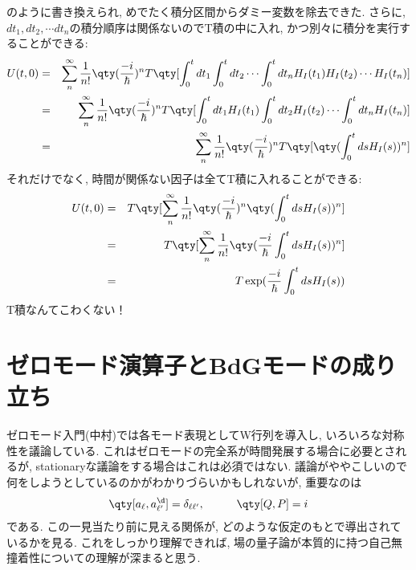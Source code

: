 \documentclass[10.5pt,a4paper]{jreport}
\begin{document}
のように書き換えられ, めでたく積分区間からダミー変数を除去できた. さらに, $dt_1, dt_2, \cdots dt_n$の積分順序は関係ないのでT積の中に入れ, かつ別々に積分を実行することができる:
\begin{eqnarray}
  U(t, 0) &=& \sum_{n}^\infty\frac{1}{n!}\qty(\frac{-i}{\hbar})^nT\qty[\int_0^t dt_1 \int_0^{t} dt_2\cdots\int_0^{t} dt_nH_I(t_1)H_I(t_2)\cdots H_I(t_n)]\\
  &=& \sum_{n}^\infty\frac{1}{n!}\qty(\frac{-i}{\hbar})^nT\qty[\int_0^t dt_1H_I(t_1) \int_0^{t} dt_2H_I(t_2)\cdots\int_0^{t} dt_nH_I(t_n)]\\
  &=& \sum_{n}^\infty\frac{1}{n!}\qty(\frac{-i}{\hbar})^nT\qty[\qty(\int_0^t ds H_I(s))^n]
\end{eqnarray}
それだけでなく, 時間が関係ない因子は全てT積に入れることができる:
\begin{eqnarray}
  U(t, 0) &=& T\qty[\sum_{n}^\infty\frac{1}{n!}\qty(\frac{-i}{\hbar})^n\qty(\int_0^t ds H_I(s))^n]\\
  &=& T\qty[\sum_{n}^\infty\frac{1}{n!}\qty(\frac{-i}{\hbar}\int_0^t ds H_I(s))^n]\\
  &=& T\exp(\frac{-i}{\hbar}\int_0^t ds H_I(s))
\end{eqnarray}
T積なんてこわくない！
\newpage
\section{ゼロモード演算子とBdGモードの成り立ち}
ゼロモード入門(中村)では各モード表現としてW行列を導入し, いろいろな対称性を議論している. これはゼロモードの完全系が時間発展する場合に必要とされるが, stationaryな議論をする場合はこれは必須ではない. 議論がややこしいので何をしようとしているのかがわかりづらいかもしれないが, 重要なのは
\begin{eqnarray}
  \qty[a_{\ell}, a^\d_{\ell'}] = \delta_{\ell\ell'}, \hspace{1cm} \qty[Q, P] = i
\end{eqnarray}
である. この一見当たり前に見える関係が, どのような仮定のもとで導出されているかを見る. これをしっかり理解できれば, 場の量子論が本質的に持つ自己無撞着性についての理解が深まると思う.
\end{document}

